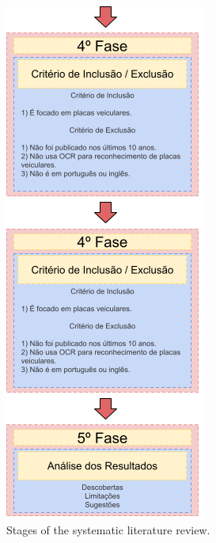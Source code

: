 \documentclass[conference]{IEEEtran}
\begin{document}
	\begin{figure}[htbp]
		\centerline{\includegraphics{img2.png}}
		\caption{Stages of the systematic literature review.}
		\label{img2}
	\end{figure}
	
\end{document}
